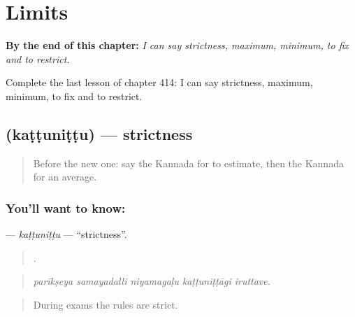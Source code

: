 
\chapter{Limits}
\label{ch:ka-limits}

\begin{chapteropening}
\textbf{By the end of this chapter:} \emph{I can say strictness, maximum, minimum, to fix and to restrict.}

Complete the last lesson of chapter 414: I can say strictness, maximum, minimum, to fix and to restrict.
\end{chapteropening}

\section[\texorpdfstring{\kn{ಕಟ್ಟುನಿಟ್ಟು} (kaṭṭuniṭṭu)}{ಕಟ್ಟುನಿಟ್ಟು (kaṭṭuniṭṭu)}]{ (kaṭṭuniṭṭu) — strictness}

\label{lesson:KA-C414-kattunittu}



\begin{quote}
Before the new one: say the Kannada for to estimate, then the Kannada for an average.
\end{quote}

\subsection*{You'll want to know: }
\textbf{} — \emph{kaṭṭuniṭṭu} — \textquotedblleft{}strictness\textquotedblright{}.

\begin{quote}
    .
\end{quote}

\begin{quote}
\emph{parīkṣeya samayadalli niyamagaḷu kaṭṭuniṭṭāgi iruttave.}
\end{quote}

\begin{quote}
During exams the rules are strict.
\end{quote}

